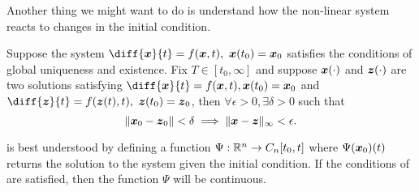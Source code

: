 Another thing we might want to do is understand how the non-linear system reacts
to changes in the initial condition.
\begin{theorem}
	Suppose the system $\diff{\bs{x}}{t} = f(\bs{x}, t),\ \bs{x}(t_0) = \bs{x}_0$
	satisfies the conditions of global uniqueness and existence. Fix $T\in[t_0,
	\infty]$ and suppose $\boldsymbol{x}(\cdot)$ and $\boldsymbol{z}(\cdot)$  are two solutions
	satisfying $\diff{\bs{x}}{t} = f(\bs{x}, t), \bs{x}(t_0) = \bs{x}_0$ and
	$\diff{\bs{z}}{t} = f(\bs{z}(t), t),\ \bs{z}(t_0)=\bs{z}_0$, then $\forall
	\epsilon > 0, \exists \delta > 0$ such that \[
		\|\boldsymbol{x}_0 - \boldsymbol{z}_0\| < \delta \implies \|\boldsymbol{x} - \boldsymbol{z}\|_{\infty} <
		\epsilon.
	\]
	\label{thm:continuous-dependence-on-ic}
\end{theorem}
 is best understood by defining a function
$\Psi:\mathbb{R}^n \to C_n[t_0, t]$ where $\Psi(\boldsymbol{x}_0)(t)$ returns the solution to
the system given the initial condition. If the conditions of
 are satisfied, then the function $\Psi$
will be continuous.

